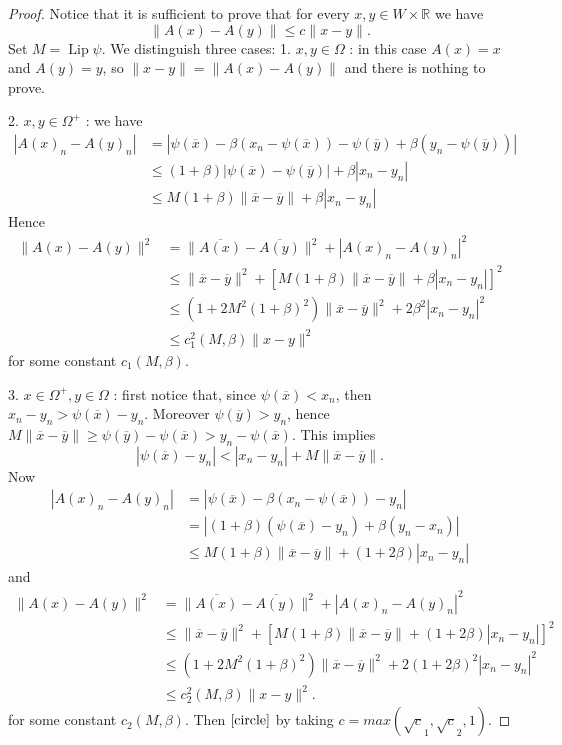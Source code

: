 \documentclass[12pt]{article}
\theoremstyle{definition}
\DeclareMathOperator\Lip{Lip}
\begin{document}
\begin{proof}
Notice that it is sufficient to prove that for every $x,y \in W \times \mathbb{R}$ we have
\begin{equation}\label{circle}
 \|A(x)-A(y)\| \le c\|x-y \|.
\end{equation}
Set $M= \Lip \psi$. We distinguish three cases: 1. $x,y \in \Omega$ : in this case $A(x)=x$ and $A(y)=y$, so $\|x-y \| = \|A(x)-A(y)\|$ and there is nothing to prove.

2. $x,y \in \Omega^+$ : we have 
\begin{align*}
|A(x)_n-A(y)_n|&=|\psi(\overline x)-\beta(x_n-\psi(\overline x))-\psi(\overline y)+\beta(y_n-\psi(\overline y))| \\
				& \le (1+\beta)|\psi(\overline x)-\psi(\overline y)| + \beta|x_n-y_n|\\
				& \le M(1+\beta)\|\overline x -\overline y\| + \beta|x_n-y_n|
\end{align*}
Hence
\begin{align*}
\|A(x)-A(y)\|^2 &=\|\overline {A(x)} -\overline {A(y)}\|^2+|A(x)_n-A(y)_n|^2\\
& \le \|\overline x -\overline y\|^2+[M(1+\beta)\|\overline x -\overline y\| + \beta|x_n-y_n|]^2 \\
& \le (1+2M^2(1+\beta)^2)\|\overline x -\overline y\|^2+2\beta^2|x_n-y_n|^2 \\
& \le c_1^2(M,\beta)\|x-y\|^2
\end{align*}
for some constant $c_1(M,\beta)$.

3. $x \in \Omega^+, y \in \Omega$ : first notice that, since $\psi(\overline x) < x_n$, then $x_n-y_n>\psi(\overline x)-y_n$. Moreover $\psi(\overline y) > y_n$, hence $M\|\overline x -\overline y\| \ge \psi(\overline y)-\psi(\overline x)> y_n-\psi(\overline x).$ This implies
\[ |\psi(\overline x)-y_n |< |x_n-y_n|+M\|\overline x -\overline y\|.\]
Now
\begin{align*}
|A(x)_n-A(y)_n|&=|\psi(\overline x)-\beta(x_n-\psi(\overline x))-y_n| \\
				&=|(1+\beta)(\psi(\overline x)-y_n)+\beta(y_n-x_n)|\\
				&\le M(1+\beta)\|\overline x -\overline y\|+(1+2\beta)|x_n-y_n|
\end{align*}
and
\begin{align*}
\|A(x)-A(y)\|^2 &=\|\overline {A(x)} -\overline {A(y)}\|^2+|A(x)_n-A(y)_n|^2\\
& \le \|\overline x -\overline y\|^2+[M(1+\beta)\|\overline x -\overline y\|+(1+2\beta)|x_n-y_n|]^2 \\
& \le (1+2M^2(1+\beta)^2)\|\overline x -\overline y\|^2+2(1+2\beta)^2|x_n-y_n|^2 \\
& \le c_2^2(M,\beta)\|x-y\|^2.
\end{align*}
for some constant $c_2(M,\beta)$. Then $\eqref{circle}$ by taking $c=max(\sqrt c_1,\sqrt c_2,1)$.

\end{proof}
\end{document}
